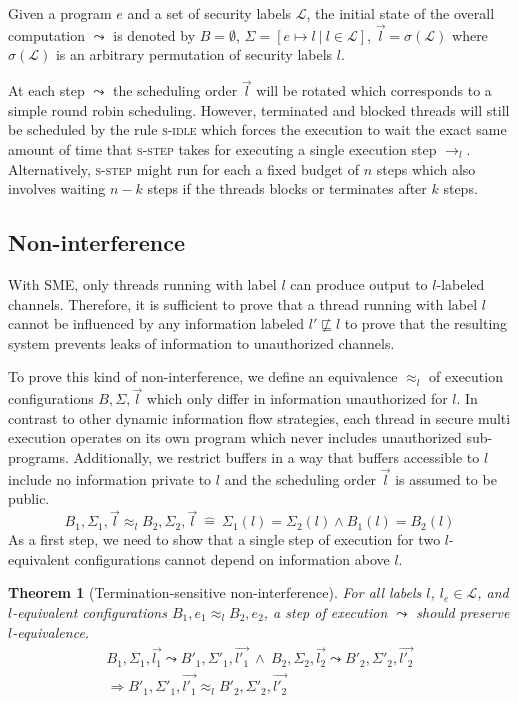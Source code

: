 \documentclass[10pt,preprint]{sigplanconf}
\newtheorem{theorem}{Theorem}
\begin{document}
Given a program $e$ and a set of security labels $\mathcal{L}$, the initial state of the overall computation $\leadsto$ is denoted by $B = \emptyset$, $\Sigma = [e \mapsto l ~|~ l \in \mathcal{L}]$, $\vec{l} = \sigma(\mathcal{L})$ where $\sigma(\mathcal{L})$ is an arbitrary permutation of security labels $l$.

At each step $\leadsto$ the scheduling order $\vec{l}$ will be rotated which corresponds to a simple round robin scheduling.  However, terminated and blocked threads will still be scheduled by the rule \textsc{s-idle} which forces the execution to wait the exact same amount of time that \textsc{s-step} takes for executing a single execution step $\rightarrow_l$.  Alternatively, \textsc{s-step} might run for each a fixed budget of $n$ steps which also involves waiting $n-k$ steps if the threads blocks or terminates after $k$ steps.

\subsection{Non-interference}

With SME, only threads running with label $l$ can produce output to $l$-labeled channels.  Therefore, it is sufficient to prove that a thread running with label $l$ cannot be influenced by any information labeled $l' \not \sqsubseteq l$ to prove that the resulting system prevents leaks of information to unauthorized channels.

To prove this kind of non-interference, we define an equivalence  $\approx_l$ of execution configurations $B,\Sigma,\vec{l}$ which only differ in information unauthorized for $l$.  In contrast to other dynamic information flow strategies, each thread in secure multi execution operates on its own program which never includes unauthorized sub-programs.  Additionally, we restrict buffers in a way that buffers accessible to $l$ include no information private to $l$ and the scheduling order $\vec{l}$ is assumed to be public.
\[ B_1,\Sigma_1, \vec{l} \approx_l B_2,\Sigma_2, \vec{l}~\hat{=}~ \Sigma_1(l) = \Sigma_2(l) \wedge B_1(l) = B_2(l) \]
As a first step, we need to show that a single step of execution for two $l$-equivalent configurations cannot depend on information above $l$.

\begin{theorem}[Termination-sensitive non-interference]
  For all labels $l$, $l_e \in \mathcal{L}$, and $l$-equivalent configurations $B_1,e_1 \approx_l B_2,e_2$, a step of execution $\leadsto$ should preserve $l$-equivalence.
  \begin{align*}
    B_1,\Sigma_1, \vec{l_1} \leadsto B'_1,\Sigma'_1, \vec{l'_1} ~\wedge~B_2,\Sigma_2,\vec{l_2} \leadsto B'_2,\Sigma'_2, \vec{l'_2} \\
    \Rightarrow B'_1,\Sigma'_1, \vec{l'_1} \approx_l B'_2,\Sigma'_2, \vec{l'_2}
  \end{align*}
\end{theorem}
\end{document}
